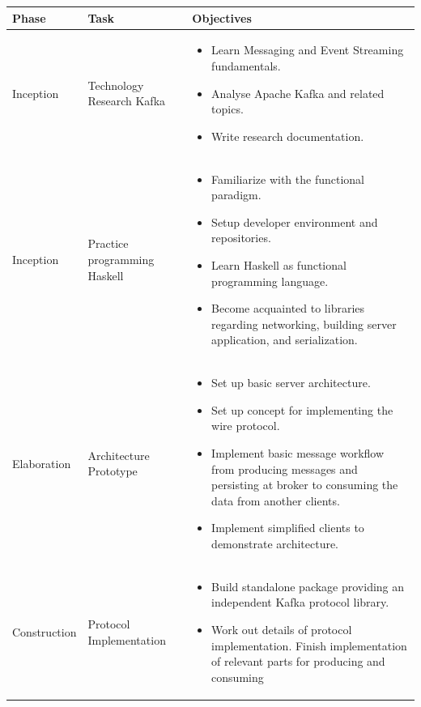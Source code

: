 \begin{tabular}[H]{|l|l|p{8cm}|}\hline
    \textbf{Phase} & \textbf{Task} & \textbf{Objectives} \\ \hline \hline
    Inception & Technology Research Kafka & 
        \begin {itemize}
            \item Learn Messaging and Event Streaming fundamentals.
            \item Analyse Apache Kafka and related topics. 
            \item Write research documentation.
        \end{itemize} \\ \hline
    Inception & Practice programming Haskell & 
        \begin {itemize}
            \item Familiarize with the functional paradigm.
            \item Setup developer environment and repositories. 
            \item Learn Haskell as functional programming language.
            \item Become acquainted to libraries regarding networking,
              building server application, and serialization.
        \end{itemize} \\ \hline
    Elaboration & Architecture Prototype &
        \begin {itemize}
            \item Set up basic server architecture.
            \item Set up concept for implementing the wire protocol.
            \item Implement basic message workflow from producing messages and
            persisting at broker to consuming the data from another clients.
            \item Implement simplified clients to demonstrate architecture.
        \end{itemize} \\ \hline
    Construction & Protocol Implementation &
        \begin {itemize}
            \item Build standalone package providing an independent Kafka
                protocol library.
            \item Work out details of protocol implementation. Finish
                implementation of relevant parts for producing and consuming

\end{itemize}
\end{tabular}
